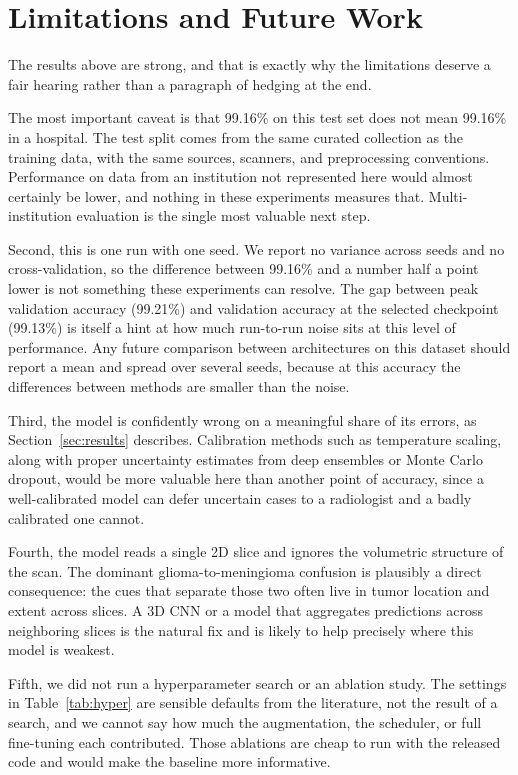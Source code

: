 \documentclass[twocolumn]{article}
\begin{document}
\section{Limitations and Future Work}
\label{sec:limitations}
The results above are strong, and that is exactly why the limitations deserve a fair hearing rather than a paragraph of hedging at the end.

The most important caveat is that 99.16\% on this test set does not mean 99.16\% in a hospital. The test split comes from the same curated collection as the training data, with the same sources, scanners, and preprocessing conventions. Performance on data from an institution not represented here would almost certainly be lower, and nothing in these experiments measures that. Multi-institution evaluation is the single most valuable next step.

Second, this is one run with one seed. We report no variance across seeds and no cross-validation, so the difference between 99.16\% and a number half a point lower is not something these experiments can resolve. The gap between peak validation accuracy (99.21\%) and validation accuracy at the selected checkpoint (99.13\%) is itself a hint at how much run-to-run noise sits at this level of performance. Any future comparison between architectures on this dataset should report a mean and spread over several seeds, because at this accuracy the differences between methods are smaller than the noise.

Third, the model is confidently wrong on a meaningful share of its errors, as Section~\ref{sec:results} describes. Calibration methods such as temperature scaling, along with proper uncertainty estimates from deep ensembles or Monte Carlo dropout, would be more valuable here than another point of accuracy, since a well-calibrated model can defer uncertain cases to a radiologist and a badly calibrated one cannot.

Fourth, the model reads a single 2D slice and ignores the volumetric structure of the scan. The dominant glioma-to-meningioma confusion is plausibly a direct consequence: the cues that separate those two often live in tumor location and extent across slices. A 3D CNN or a model that aggregates predictions across neighboring slices is the natural fix and is likely to help precisely where this model is weakest.

Fifth, we did not run a hyperparameter search or an ablation study. The settings in Table~\ref{tab:hyper} are sensible defaults from the literature, not the result of a search, and we cannot say how much the augmentation, the scheduler, or full fine-tuning each contributed. Those ablations are cheap to run with the released code and would make the baseline more informative.
\end{document}
